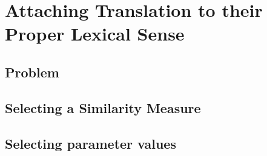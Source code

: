 \documentclass{beamer}
\begin{document}
\section{Attaching Translation to their Proper Lexical Sense}

\subsection{Problem}


\subsection{Selecting a Similarity Measure}


\subsection{Selecting parameter values}
\end{document}
